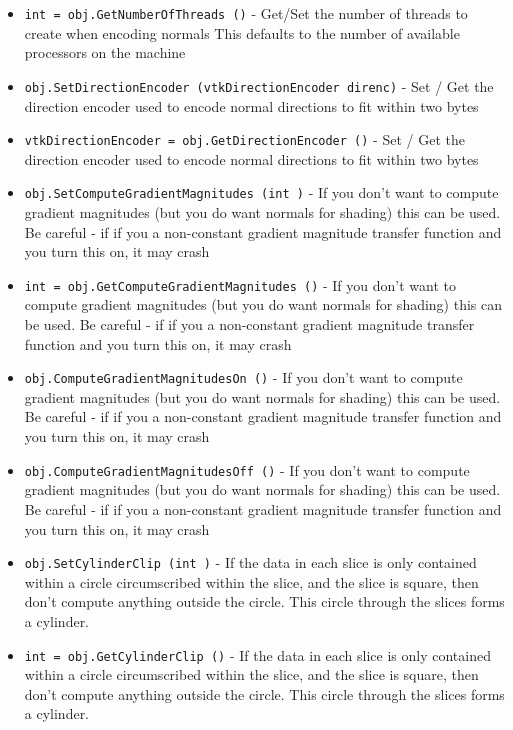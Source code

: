 \begin{itemize}
\item  \verb|int = obj.GetNumberOfThreads ()| -  Get/Set the number of threads to create when encoding normals
 This defaults to the number of available processors on the machine

\item  \verb|obj.SetDirectionEncoder (vtkDirectionEncoder direnc)| -  Set / Get the direction encoder used to encode normal directions
 to fit within two bytes

\item  \verb|vtkDirectionEncoder = obj.GetDirectionEncoder ()| -  Set / Get the direction encoder used to encode normal directions
 to fit within two bytes

\item  \verb|obj.SetComputeGradientMagnitudes (int )| -  If you don't want to compute gradient magnitudes (but you
 do want normals for shading) this can be used. Be careful - if
 if you a non-constant gradient magnitude transfer function and
 you turn this on, it may crash

\item  \verb|int = obj.GetComputeGradientMagnitudes ()| -  If you don't want to compute gradient magnitudes (but you
 do want normals for shading) this can be used. Be careful - if
 if you a non-constant gradient magnitude transfer function and
 you turn this on, it may crash

\item  \verb|obj.ComputeGradientMagnitudesOn ()| -  If you don't want to compute gradient magnitudes (but you
 do want normals for shading) this can be used. Be careful - if
 if you a non-constant gradient magnitude transfer function and
 you turn this on, it may crash

\item  \verb|obj.ComputeGradientMagnitudesOff ()| -  If you don't want to compute gradient magnitudes (but you
 do want normals for shading) this can be used. Be careful - if
 if you a non-constant gradient magnitude transfer function and
 you turn this on, it may crash

\item  \verb|obj.SetCylinderClip (int )| -  If the data in each slice is only contained within a circle circumscribed
 within the slice, and the slice is square, then don't compute anything
 outside the circle. This circle through the slices forms a cylinder.

\item  \verb|int = obj.GetCylinderClip ()| -  If the data in each slice is only contained within a circle circumscribed
 within the slice, and the slice is square, then don't compute anything
 outside the circle. This circle through the slices forms a cylinder.


\end{itemize}
